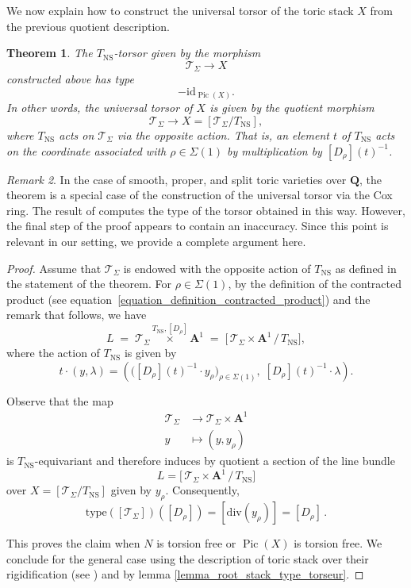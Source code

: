 \documentclass{proc-l}
\newcommand{\Q}{\mathbf{Q}}
\DeclareMathOperator{\Pic}{Pic}
\DeclareMathOperator{\NS}{NS}
\newcommand{\stackT}{\mathcal{T}}
\newcommand{\affine}{\mathbf{A}}
\newtheorem{theorem}{Theorem}[section]
\theoremstyle{definition}
\theoremstyle{remark}
\newtheorem{remark}[theorem]{Remark}
\numberwithin{equation}{section}
\begin{document}
We now explain how to construct the universal torsor of the toric stack $X$ from the previous quotient description.

\begin{theorem}\label{theorem_cox_ring_universal_torsor}
The $T_{\NS}$-torsor given by the morphism
$$\stackT_{\Sigma} \rightarrow X$$
constructed above has type
$$- \mathrm{id}_{\Pic(X)}.$$
In other words, the universal torsor of $X$ is given by the quotient morphism
$$\stackT_{\Sigma} \rightarrow X = [\stackT_{\Sigma} / T_{\NS}],$$
where $T_{\NS}$ acts on $\stackT_{\Sigma}$ via the opposite action. That is, an element $t$ of $T_{\NS}$ acts on the coordinate associated with $\rho \in \Sigma(1)$ by multiplication by $[D_{\rho}](t)^{-1}$.
\end{theorem}

\begin{remark}
In the case of smooth, proper, and split toric varieties over $\Q$, the theorem is a special case of the construction of the universal torsor via the Cox ring. The result of \cite[Proposition~1.6.1.7]{ArzhantsevDerenthalHausenLaface2015} computes the type of the torsor obtained in this way. However, the final step of the proof appears to contain an inaccuracy. Since this point is relevant in our setting, we provide a complete argument here.
\end{remark}


\begin{proof}
Assume that $\stackT_{\Sigma}$ is endowed with the opposite action of $T_{\NS}$
as defined in the statement of the theorem. For $\rho \in \Sigma(1)$, by the
definition of the contracted product (see equation~\ref{equation_definition_contracted_product}) and the remark that follows,
we have
\[
L \;=\;
\stackT_{\Sigma} \overset{T_{\NS},[D_{\rho}]}{\times} \affine^1
\;=\;
\bigl[\, \stackT_{\Sigma} \times \affine^1 \,/\, T_{\NS} \bigr],
\]
where the action of $T_{\NS}$ is given by
\[
t \cdot (y,\lambda)
=
\left(
\bigl([D_{\rho}](t)^{-1} \cdot y_{\rho}\bigr)_{\rho \in \Sigma(1)},
\;
[D_{\rho}](t)^{-1} \cdot \lambda
\right).
\]

Observe that the map
\begin{align*}
\stackT_{\Sigma} &\longrightarrow \stackT_{\Sigma}\times \affine^1 \\
y &\longmapsto (y,y_{\rho})
\end{align*}
is $T_{\NS}$-equivariant and therefore induces by quotient a section of the line bundle $$L = \bigl[\, \stackT_{\Sigma} \times \affine^1 \,/\, T_{\NS} \bigr] $$over $X = [\stackT_{\Sigma} / T_{\NS} ]$ given by $y_{\rho}$. Consequently,
\[
\mathrm{type}([\stackT_{\Sigma}])([D_{\rho}])
=
[\mathrm{div}(y_{\rho})]
=
[D_{\rho}] \, .
\]

This proves the claim when $N$ is torsion free or $\Pic(X)$ is torsion free. We conclude for the general case using the description of toric stack over their rigidification (see \cite[Corollary 6.26]{fantechi_toric_stack}) and by lemma \ref{lemma_root_stack_type_torseur}.

\end{proof}
\end{document}
